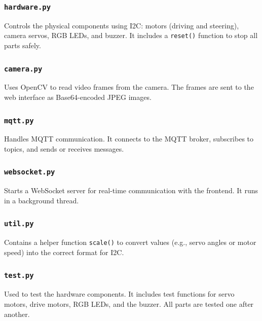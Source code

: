     \subsubsection*{\texttt{hardware.py}}
    Controls the physical components using I2C: motors (driving and steering), camera servos, RGB LEDs, and buzzer. It includes a \texttt{reset()} function to stop all parts safely.

    \subsubsection*{\texttt{camera.py}}
    Uses OpenCV to read video frames from the camera. The frames are sent to the web interface as Base64-encoded JPEG images.

    \subsubsection*{\texttt{mqtt.py}}
    Handles MQTT communication. It connects to the MQTT broker, subscribes to topics, and sends or receives messages.

    \subsubsection*{\texttt{websocket.py}}
    Starts a WebSocket server for real-time communication with the frontend. It runs in a background thread.

    \subsubsection*{\texttt{util.py}}
    Contains a helper function \texttt{scale()} to convert values (e.g., servo angles or motor speed) into the correct format for I2C.

    \subsubsection*{\texttt{test.py}}
    Used to test the hardware components. It includes test functions for servo motors, drive motors, RGB LEDs, and the buzzer. All parts are tested one after another.
